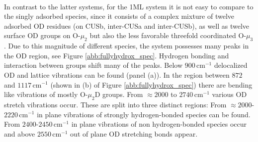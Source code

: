 \documentclass[11pt,DIV=13,BCOR=5mm,a4paper,headinclude]{scrbook}
\begin{document}
\\
In contrast to the latter systems, for the 1ML system it is not easy to compare to the singly adsorbed species, since it consists of a complex mixture of twelve adsorbed OD residues (on CUSb, inter-CUSa and inter-CUSb), as well as twelve surface OD groups on O-$\mu_2$ but also the less favorable threefold coordinated O-$\mu_3$.
Due to this magnitude of different species, the system possesses many peaks in the OD region, see Figure \ref{abb:fullyhydrox_spec}.
Hydrogen bonding and interaction between groups shift many of the peaks.
Below $900\,$cm$^{-1}$ delocalized OD and lattice vibrations can be found (panel (a)).
In the region between $872$ and $1117\,$cm$^{-1}$ (shown in (b) of Figure \ref{abb:fullyhydrox_spec}) there are bending like vibrations of mostly O-$\mu_2$D groups.
From $\approx2000$ to $2740\,$cm$^{-1}$ various OD stretch vibrations occur.
These are split into three distinct regions: From $\approx 2000$-$2220\,$cm$^{-1}$ in plane vibrations of strongly hydrogen-bonded species can be found.
From $2400$-$2450\,$cm$^{-1}$ in plane vibrations of non hydrogen-bonded species occur and above $2550\,$cm$^{-1}$ out of plane OD stretching bonds appear.
\end{document}
